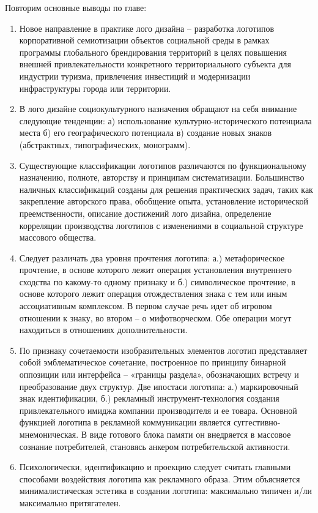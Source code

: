 Повторим основные выводы по главе:
\begin{enumerate}
\item Новое направление в практике лого дизайна – разработка логотипов корпоративной семиотизации объектов  социальной среды в рамках программы глобального брендирования территорий в целях повышения внешней привлекательности конкретного территориального субъекта для индустрии туризма, привлечения инвестиций и модернизации инфраструктуры города или территории.   
\item В лого дизайне социокультурного назначения обращают на себя внимание следующие тенденции: а) использование культурно-исторического потенциала места б) его географического потенциала в) создание новых знаков (абстрактных, типографических, монограмм). 
\item Существующие классификации логотипов различаются по функциональному назначению, полноте, авторству и принципам систематизации. Большинство наличных классификаций созданы для решения практических задач, таких как закрепление авторского права, обобщение опыта, установление исторической преемственности, описание достижений лого дизайна, определение корреляции производства логотипов с изменениями в социальной структуре массового общества.
\item Следует различать два уровня прочтения логотипа: а.) метафорическое прочтение, в основе которого лежит операция установления внутреннего сходства по какому-то одному признаку  и б.) символическое прочтение, в основе которого лежит операция отождествления знака с тем или иным ассоциативным комплексом. В первом случае речь идет об игровом отношении к знаку, во втором – о мифотворческом. Обе операции могут находиться в отношениях дополнительности.
\item По признаку сочетаемости изобразительных элементов  логотип представляет собой эмблематическое сочетание, построенное по принципу бинарной оппозиции или интерфейса – «границы раздела», обозначающих встречу и преобразование двух структур. 
Две ипостаси логотипа: а.) маркировочный знак идентификации, б.) рекламный инструмент-технология создания привлекательного имиджа компании производителя и ее товара. Основной функцией логотипа в рекламной коммуникации является суггестивно-мнемоническая. В виде готового блока памяти он внедряется в массовое сознание потребителей, становясь анкером потребительской активности.
\item Психологически, идентификацию и проекцию следует считать главными способами воздействия логотипа как рекламного образа. Этим объясняется минималистическая эстетика в создании логотипа: максимально типичен и/ли максимально притягателен.  

\end{enumerate}
